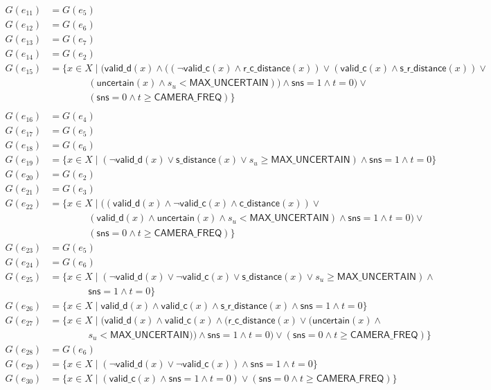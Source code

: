 \documentclass[12pt]{article}
\theoremstyle{definition}
\begin{document}
\[\begin{aligned}
G(e_{11}) &= G(e_5) \\ 
G(e_{12}) &= G(e_6) \\
G(e_{13}) &= G(e_7) \\ 
G(e_{14}) &= G(e_2) \\
G(e_{15}) &= \{x \in X \mid \big(\mathsf{valid\_d}(x) \land ((\neg \mathsf{valid\_c}(x) \land \mathsf{r\_c\_distance}(x)) \lor (\mathsf{valid\_c}(x) \land \mathsf{s\_r\_distance}(x)) \lor \\
&\qquad\qquad (\mathsf{uncertain}(x) \land s_u < \mathsf{MAX\_UNCERTAIN})) \land \mathsf{sns} = 1 \land t = 0 \big) \lor \\
&\qquad\qquad(\mathsf{sns} = 0 \land t \ge \mathsf{CAMERA\_FREQ}) \} \\
\end{aligned}
\]
\[
\begin{aligned}
G(e_{16}) &= G(e_4) \\
G(e_{17}) &= G(e_5) \\
G(e_{18}) &= G(e_6) \\
G(e_{19}) &= \{x \in X \mid (\neg \mathsf{valid\_d}(x) \lor \mathsf{s\_distance}(x) \lor s_u \ge \mathsf{MAX\_UNCERTAIN}) \land \mathsf{sns} = 1 \land t = 0 \}\\
G(e_{20}) &= G(e_2)\\
G(e_{21}) &= G(e_3) \\
G(e_{22}) &= \{x \in X \mid \big((\mathsf{valid\_d}(x) \land \neg \mathsf{valid\_c}(x) \land \mathsf{c\_distance}(x)) \lor \\
&\qquad\qquad(\mathsf{valid\_d}(x) \land \mathsf{uncertain}(x) \land s_u < \mathsf{MAX\_UNCERTAIN}) \land \mathsf{sns} = 1 \land t = 0 \big) \lor \\
&\qquad\qquad(\mathsf{sns} = 0 \land t \ge \mathsf{CAMERA\_FREQ}) \} \\
G(e_{23}) &= G(e_5) \\
G(e_{24}) &= G(e_6) \\
G(e_{25}) &= \{x \in X \mid (\neg \mathsf{valid\_d}(x) \lor \neg \mathsf{valid\_c}(x) \lor \mathsf{s\_distance}(x) \lor s_u \ge \mathsf{MAX\_UNCERTAIN}) \land \\
&\qquad\qquad\mathsf{sns} = 1 \land t = 0 \}\\
G(e_{26}) &= \{x \in X \mid \mathsf{valid\_d}(x) \land \mathsf{valid\_c}(x) \land \mathsf{s\_r\_distance}(x) \land \mathsf{sns} = 1 \land t = 0 \}\\
G(e_{27}) &= \{x \in X \mid \big(\mathsf{valid\_d}(x) \land \mathsf{valid\_c}(x) \land (\mathsf{r\_c\_distance}(x) \lor (\mathsf{uncertain}(x) \land \\ 
&\qquad\qquad s_u < \mathsf{MAX\_UNCERTAIN}))  \land \mathsf{sns} = 1 \land t = 0 \big) \lor (\mathsf{sns} = 0 \land t \ge \mathsf{CAMERA\_FREQ}) \} \\
G(e_{28}) &= G(e_6) \\
G(e_{29}) &= \{ x \in X \mid (\neg \mathsf{valid\_d}(x) \lor \neg \mathsf{valid\_c}(x)) \land \mathsf{sns} = 1 \land t = 0 \} \\
G(e_{30}) &= \{ x \in X \mid (\mathsf{valid\_c}(x) \land \mathsf{sns} = 1 \land t = 0) \lor (\mathsf{sns} = 0 \land t \ge \mathsf{CAMERA\_FREQ}) \} \\
\end{aligned}
\]
\end{document}
